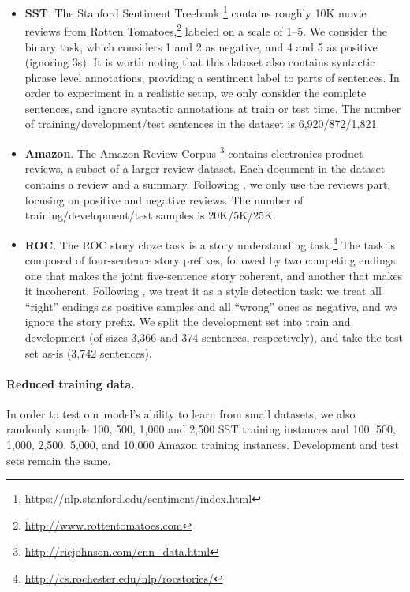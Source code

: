 \documentclass[11pt,a4paper]{article}
\renewcommand{\cite}[1]{\citep{#1}}
\newcommand{\camready}[1]{#1}
\begin{document}
\begin{itemize}[itemsep=0pt,topsep=3pt,leftmargin=*]
\item {\bf SST}. The Stanford Sentiment Treebank \cite{Socher:2013}\camready{\footnote{\url{https://nlp.stanford.edu/sentiment/index.html}}} contains roughly 10K movie reviews from Rotten Tomatoes,\camready{\footnote{\url{http://www.rottentomatoes.com}}} labeled on a scale of 1--5.
We consider the binary task, which considers 1 and 2 as
negative, and 4 and 5 as positive (ignoring 3s).
It is worth noting that this dataset also contains
syntactic phrase level annotations, providing a sentiment label to parts of sentences. 
In order to experiment in a realistic setup, we only consider the complete sentences,
and ignore syntactic annotations at train or test time.
The number of training/development/test sentences in the dataset is 6,920/872/1,821.

\item{\bf Amazon}. The Amazon Review Corpus \cite{McAuley:2013}\camready{\footnote{\url{http://riejohnson.com/cnn_data.html}}} contains electronics product reviews\camready{,
a subset of a larger review dataset}.
Each document in the dataset contains a review and a summary. 
Following \citet{Yogatama:2015}, we only use the reviews part, focusing on positive and negative reviews.
The number of training/development/test samples is 20K/5K/25K.

\item{\bf ROC}. The ROC story cloze task \cite{Mostafazadeh:2016} is a story understanding task.\camready{\footnote{\url{http://cs.rochester.edu/nlp/rocstories/}}}
The task is composed of four-sentence story prefixes, followed by two competing endings: one that makes the joint five-sentence story coherent, and another that makes it incoherent. 
Following \citet{Schwartz:2017}, we treat it as a style detection task: 
we treat all ``right'' endings as positive samples and all ``wrong'' ones as negative, and we ignore the story prefix. 
We split the development set into train and development (of sizes 3,366 and 374 sentences, respectively), and take the test set as-is (3,742 sentences).
\end{itemize}

\paragraph{Reduced training data.}
In order to test our model's ability to learn from small datasets, we also randomly sample 100, 500, 1,000 and 2,500 SST training instances and 
 100, 500, 1,000, 2,500, 5,000, and 10,000 Amazon training instances.
Development and test sets remain the same.
\end{document}
